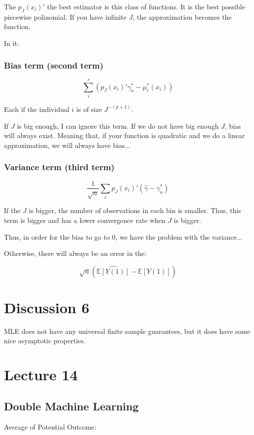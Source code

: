 \documentclass{article}
\begin{document}
The $p_J (x_i)'$ the best estimator is this class of functions. It is the best possible piecewise polinomial. If you have infinite $J$, the approximation becomes the function.

In it:

\subsubsection{Bias term (second term)}

$$
\sum_i^r (p_J (x_i)' \gamma_n^{*} - \mu_i^{*}(x_i))
$$

Each if the individual $i$ is of size $J^{-(p+1)}$.

If $J$ is big enough, I can ignore this term. If we do not have big enough $J$, bias will always exist. Meaning that, if your function is quadratic and we do a linear approximation, we will always have bias...

\subsubsection{Variance term (third term)}

$$
\frac{1}{\sqrt{n}} \sum_i p_J (x_i)' (\hat{\gamma} - \gamma_n^{*})
$$ 

If the $J$ is bigger, the number of observations in each bin is smaller. Thus, this term is bigger and has a lower convergence rate when $J$ is bigger.

Thus, in order for the bias to go to 0, we have the problem with the variance...

Otherwise, there will always be an error in the:

$$
\sqrt{n} \left( \hat{\mathbb{E}[Y(1)]} - \mathbb{E}[Y(1)] \right)
$$

\section*{Discussion 6}

MLE does not have any universal finite sample guarantees, but it does have some nice asymptotic properties.

\section{Lecture 14}

\subsection{Double Machine Learning}
Average of Potential Outcome:
\end{document}
